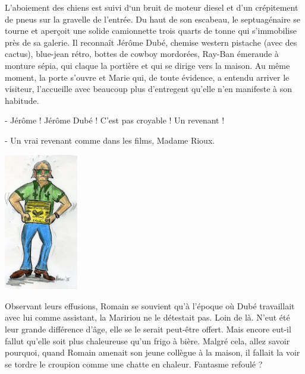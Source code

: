 
L’aboiement des chiens est suivi d‘un bruit de moteur diesel et d’un crépitement de pneus sur la gravelle de l’entrée. Du haut de son escabeau, le septuagénaire se tourne et aperçoit une solide camionnette trois quarts de tonne qui s’immobilise près de sa galerie. Il reconnaît Jérôme Dubé, chemise western pistache (avec des cactus), blue-jean rétro, bottes de cowboy mordorées, Ray-Ban émeraude à monture sépia, qui claque la portière et qui se dirige vers la maison. Au même moment, la porte s’ouvre et Marie qui, de toute évidence, a entendu arriver le visiteur, l’accueille avec beaucoup plus d’entregent qu’elle n’en manifeste à son habitude.

- Jérôme ! Jérôme Dubé ! C’est pas croyable ! Un revenant !

- Un vrai revenant comme dans les films, Madame Rioux.

\begin{floatingfigure}[l]{40mm}
\includegraphics[height=60mm]{corps/chapitre5/img/jerome.jpg}
\end{floatingfigure}

Observant leurs effusions, Romain se souvient qu’à l’époque où Dubé travaillait avec lui comme assistant, la Maririou ne le détestait pas. Loin de là. N’eut été leur grande différence d’âge, elle se le serait peut-être offert. Mais encore eut-il fallut qu’elle soit plus chaleureuse qu’un frigo à bière. Malgré cela, allez savoir pourquoi, quand Romain amenait son jeune collègue à la maison, il fallait la voir se tordre le croupion comme une chatte en chaleur. Fantasme refoulé ?

